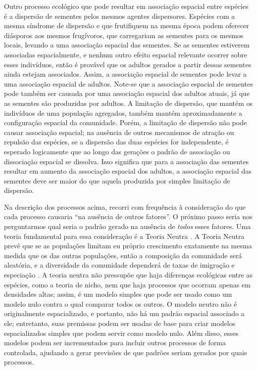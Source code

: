 \documentclass[twoside,12pt,a4paper]{report}
\begin{document}
Outro processo ecológico que pode resultar em associação espacial entre espécies é a
dispersão de sementes pelos mesmos agentes dispersores. Espécies com a mesma síndrome de
dispersão e que frutifiquem na mesma época podem oferecer diásporos aos mesmos frugívoros, que carregariam as
sementes para os mesmos locais, levando a uma associação espacial das sementes. Se as
sementes estiverem associadas espacialmente, e nenhum outro efeito espacial relevante ocorrer
sobre esses indivíduos, então é provável que os adultos gerados a partir dessas sementes ainda estejam
associados. Assim, a associação espacial de sementes pode levar a uma associação espacial de
adultos. Note-se que a associação espacial de sementes pode também ser causada por uma
associação espacial dos adultos atuais, já que as sementes são produzidas por adultos. A
limitação de dispersão, que mantém os indivíduos de uma população agregados, também mantém
aproximadamente a configuração espacial da comunidade. Porém, a limitação de dispersão não
pode causar associação espacial; na ausência de outros mecanismos de atração ou
repulsão das espécies, se a dispersão das duas espécies for independente, é esperado
logicamente que ao longo das
gerações o padrão de associação ou dissociação espacial se dissolva. Isso significa que para
a associação das sementes resultar em aumento da associação espacial dos adultos, a
associação espacial das sementes deve ser maior do que aquela produzida por simples limitação
de dispersão.

Na descrição dos processos acima, recorri com frequência à consideração do que cada processo
causaria ``na ausência de outros fatores''. O próximo passo seria nos perguntarmos qual seria
o padrão gerado na ausência de {\em todos} esses fatores. Uma teoria fundamental para essa
consideração é a Teoria Neutra \citep{Hubbell1979}.
A Teoria Neutra prevê que se as populações limitam eu
próprio crescimento exatamente na mesma medida que os das outras populações, então a
composição da comunidade será aleatória, e a diversidade da comunidade dependerá de taxas de
imigração e especiação \citep{Hubbell2001}. A teoria neutra não pressupõe que haja diferenças ecológicas entre
as espécies, como a teoria de nicho, nem que haja processos que ocorram apenas em densidades
altas; assim, é um modelo simples que pode ser usado como um modelo nulo contra o qual comparar
todos os outros. O modelo neutro não é originalmente espacializado, e portanto, não há
um padrão espacial associado a ele; entretanto, suas premissas podem ser usadas de base para
criar modelos espacializados simples que podem servir como modelo nulo. Além disso, esses
modelos podem ser incrementados para incluir outros processos de forma controlada, ajudando a
gerar previsões de que padrões seriam gerados por quais processos.
\end{document}
